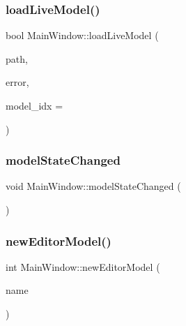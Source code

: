 \mbox{\label{class_main_window_a07658e8b85d5f8b9fd11d7f0c40bd22c}} 
\subsubsection{\texorpdfstring{loadLiveModel()}{loadLiveModel()}}
{\footnotesize\ttfamily bool Main\+Window\+::load\+Live\+Model (\begin{DoxyParamCaption}\item[{Q\+String}]{path,  }\item[{Q\+String $\ast$}]{error,  }\item[{int}]{model\+\_\+idx = {} }\end{DoxyParamCaption})}

\mbox{\label{class_main_window_ad8870f878f5ba77bc4506e453ae32b93}} 
\subsubsection{\texorpdfstring{modelStateChanged}{modelStateChanged}}
{\footnotesize\ttfamily void Main\+Window\+::model\+State\+Changed (\begin{DoxyParamCaption}{ }\end{DoxyParamCaption})\hspace{0.3cm}{\ttfamily [signal]}}

\mbox{\label{class_main_window_a11c31a7e6ec68b8146f514fe99ae7f4c}} 
\subsubsection{\texorpdfstring{newEditorModel()}{newEditorModel()}}
{\footnotesize\ttfamily int Main\+Window\+::new\+Editor\+Model (\begin{DoxyParamCaption}\item[{Q\+String}]{name }\end{DoxyParamCaption})\hspace{0.3cm}{\ttfamily [protected]}}

